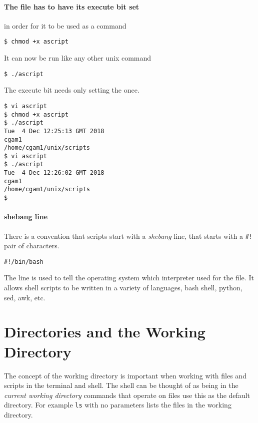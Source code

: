 \documentclass[12pt,a4paper]{article}
\begin{document}
\paragraph{The file has to have its execute bit set } in order for it
to be used as a command
\begin{terminal}
\begin{verbatim}
$ chmod +x ascript
\end{verbatim}
\end{terminal}
It can now be run like any other unix command
\begin{terminal}
\begin{verbatim}
$ ./ascript
\end{verbatim}
\end{terminal}
The execute bit needs only setting the once.

\begin{terminal}
\begin{verbatim}
$ vi ascript
$ chmod +x ascript
$ ./ascript
Tue  4 Dec 12:25:13 GMT 2018
cgam1
/home/cgam1/unix/scripts
$ vi ascript
$ ./ascript
Tue  4 Dec 12:26:02 GMT 2018
cgam1
/home/cgam1/unix/scripts
$
\end{verbatim}
\end{terminal}

\paragraph{shebang line}
There is a convention that scripts start with a \emph{shebang} line, that
starts with a \verb'#!' pair of characters.
\begin{code}
\begin{verbatim}
#!/bin/bash
\end{verbatim}
\end{code}
The line is used to tell the operating system which interpreter used for the
file.  It allows shell scripts to be written in a variety of languages, bash
shell, python, sed, awk, etc.

\section{Directories and the Working Directory}
The concept of the working directory is important when working with files and
scripts in the terminal and shell.  The shell can be thought of as being in the
\emph{current working directory} commands that operate on files use this as the
default directory.  
For example \texttt{ls} with no parameters lists the files in the working
directory.
\end{document}

